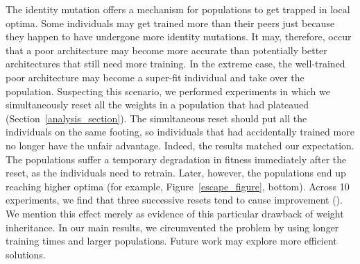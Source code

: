 \documentclass{article}
\begin{document}
The identity mutation offers a mechanism for populations to get trapped in local optima. Some individuals may get trained more than their peers just because they happen to have undergone more identity mutations. It may, therefore, occur that a poor architecture may become more accurate than potentially better architectures that still need more training. In the extreme case, the well-trained poor architecture may become a super-fit individual and take over the population. Suspecting this scenario, we performed experiments in which we simultaneously reset all the weights in a population that had plateaued (Section~\ref{analysis_section}). The simultaneous reset should put all the individuals on the same footing, so individuals that had accidentally trained more no longer have the unfair advantage. Indeed, the results matched our expectation. The populations suffer a temporary degradation in fitness immediately after the reset, as the individuals need to retrain. Later, however, the populations end up reaching higher optima (for example, Figure~\ref{escape_figure}, bottom). Across 10 experiments, we find that three successive resets tend to cause improvement (). We mention this effect merely as evidence of this particular drawback of weight inheritance. In our main results, we circumvented the problem by using longer training times and larger populations. Future work may explore more efficient solutions.
\end{document}

